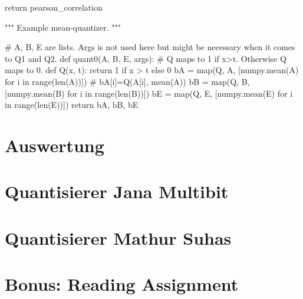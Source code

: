 \documentclass[12pt,a4paper]{article}
\begin{document}
\begin{python}
    return pearson_correlation



"""
Example mean-quantizer.
"""


# A, B, E are lists. Args is not used here but might be necessary when it comes to Q1 and Q2.
def quant0(A, B, E, args):
    # Q maps to 1 if x>t. Otherwise Q maps to 0.
    def Q(x, t): return 1 if x > t else 0
    bA = map(Q, A, [numpy.mean(A)
                    for i in range(len(A))])  # bA[i]=Q(A[i], mean(A))
    bB = map(Q, B, [numpy.mean(B) for i in range(len(B))])
    bE = map(Q, E, [numpy.mean(E) for i in range(len(E))])
    return bA, bB, bE

\end{python}

\section{Auswertung}

\section{Quantisierer Jana Multibit}

\section{Quantisierer Mathur Suhas}

\section{Bonus: Reading Assignment}



\begin{comment}
\href{https://www.rub.de}{hier klicken}


\begin{figure}[hbt!]
	\centering
		\includegraphics[width=1\textwidth ]
		{Bilder/a3_rtl_sdr.jpg}
		\caption{Hier Caption einfügen}
		\label{fig:Labelx}
\end{figure}

~\ref{fig:Labelx}

\begin{python}
print("Hello World")
\end{python}

\hspace{0.5mm}

\end{comment}
\end{document}
